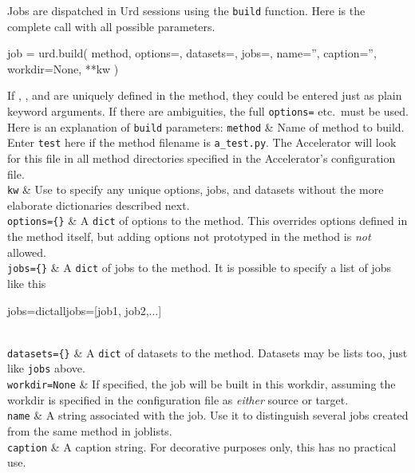Jobs are dispatched in Urd sessions using the \texttt{build} function.
Here is the complete call with all possible parameters.
\begin{python}
job = urd.build(
    method,
    options={},    datasets={},    jobs={},
    name='',       caption='',
    workdir=None,
    **kw
)
\end{python}
If \options, \datasets, and \jobs are uniquely defined in the method,
they could be entered just as plain keyword arguments.  If there are
ambiguities, the full \texttt{options=} etc.\ must be used.  Here is
an explanation of \texttt{build} parameters:
\starttabletwo
\RPtwo \texttt{method} & Name of method to build.  Enter \texttt{test}
    here if the method filename is \texttt{a\_test.py}.  The
    Accelerator will look for this file in all method directories
    specified in the Accelerator's configuration file.\\

\RPtwo \texttt{kw} & Use to specify any unique options, jobs, and datasets
    without the more elaborate dictionaries described next.\\
    
\RPtwo \texttt{options=\{\}} & A \texttt{dict} of options to the method.
    This overrides options defined in the method itself, but adding
    options not prototyped in the method is \textsl{not} allowed.\\

\RPtwo \texttt{jobs=\{\}} & A \texttt{dict} of jobs to the method.
    It is possible to specify a list of jobs like this
\begin{python}
jobs=dict{alljobs=[job1, job2,...]}
\end{python}
\\

\RPtwo \texttt{datasets=\{\}} & A \texttt{dict} of datasets to the method.
    Datasets may be lists too, just like \texttt{jobs} above.\\

\RPtwo \texttt{workdir=None} & If specified, the job will be built in
    this workdir, assuming the workdir is specified in the
    configuration file as \textsl{either} source or target.\\

\RPtwo \texttt{name} & A string associated with the job.  Use it
    to distinguish several jobs created from the same method in
    joblists.\\
    
    \texttt{caption} & A caption string.  For decorative purposes
    only, this has no practical use.\\
\stoptabletwo

